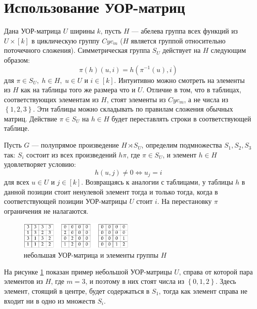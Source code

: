 \section{Использование УОР-матриц}

Дана УОР-матрица $U$ ширины $k$, пусть $H$ --- абелева группа всех функций из $U \times [k]$ в циклическую группу $Cyc_m$ ($H$ является группой относительно поточечного сложения). Симметрическая группа $S_U$ действует на $H$ следующим образом:
\[
	\pi(h)(u,i)=h(\pi^{-1}(u),i)
\]
для $\pi \in S_U, \; h \in H, \; u \in U$ и $i \in [k]$. Интуитивно можно смотреть на элементы из $H$ как на таблицы того же размера что и $U$. Отличие в том, что в таблицах, соответствующих элементам из $H$, стоят элементы из $Cyc_m$, а не числа из $\left\{ 1,2,3 \right\}$. Эти таблицы можно складывать по правилам сложения обычных матриц. Действие $\pi \in S_U$ на $h \in H$ будет переставлять строки в соответствующей таблице.

Пусть $G$ --- полупрямое произведение $H \rtimes S_U$, определим подмножества $S_1, S_2, S_3$ так: $S_i$ состоит из всех произведений $h \pi$, где $\pi \in S_U$, и элемент $h \in H$ удовлетворяет условию:
\[
	h(u,j) \neq 0 \iff u_j=i
\]
для всех $u \in U$ и $j \in [k]$. Возвращаясь к аналогии с таблицами, у таблицы $h$ в данной позиции стоит ненулевой элемент тогда и только тогда, когда в соответствующей позиции  УОР-матрицы $U$ стоит $i$. На перестановку $\pi$ ограничения не налагаются.
\begin{figure}[H]
	\centering
    \includegraphics[width=0.5\textwidth]{figures/small_usp_and_group_elements}
	\caption{небольшая УОР-матрица и элементы группы $H$}
	\label{usp:fig3.6}
\end{figure}

На рисунке \ref{usp:fig3.6} показан пример небольшой УОР-матрицы $U$, справа от которой пара элементов из $H$, где $m=3$, и поэтому в них стоят числа из $\left\{ 0,1,2 \right\}$. Здесь элемент, стоящий в центре, будет содержаться в $S_1$, тогда как элемент справа не входит ни в одно из множеств $S_i$.

